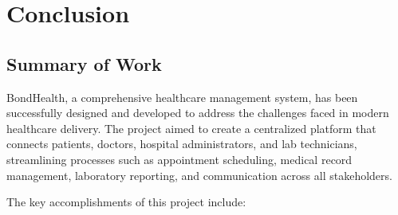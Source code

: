 \chapter{Conclusion}

\section{Summary of Work}
BondHealth, a comprehensive healthcare management system, has been successfully designed and developed to address the challenges faced in modern healthcare delivery. The project aimed to create a centralized platform that connects patients, doctors, hospital administrators, and lab technicians, streamlining processes such as appointment scheduling, medical record management, laboratory reporting, and communication across all stakeholders.

The key accomplishments of this project include:

